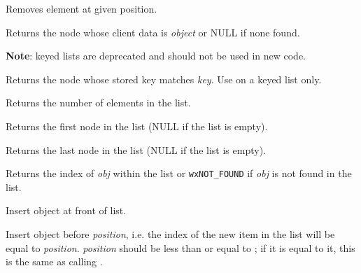 \label{wxlisterase}


Removes element at given position.

\label{wxlistfind}


Returns the node whose client data is {\it object} or NULL if none found.

{\bf Note}: keyed lists are deprecated and should not be used in new code.



Returns the node whose stored key matches {\it key}. Use on a keyed list only.

\label{wxlistgetcount}


Returns the number of elements in the list.

\label{wxlistgetfirst}


Returns the first node in the list (NULL if the list is empty).

\label{wxlistgetlast}


Returns the last node in the list (NULL if the list is empty).

\label{wxlistindexof}


Returns the index of {\it obj} within the list or {\tt wxNOT\_FOUND} if {\it obj} 
is not found in the list.

\label{wxlistinsert}


Insert object at front of list.


Insert object before {\it position}, i.e. the index of the new item in the
list will be equal to {\it position}. {\it position} should be less than or
equal to ; if it is equal to it, this is the
same as calling .

